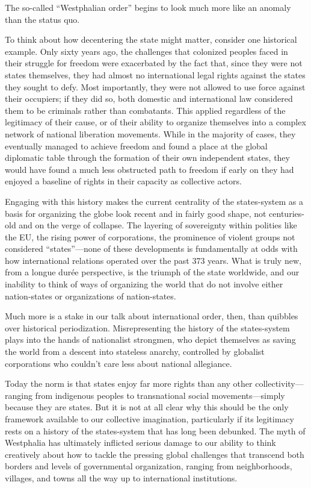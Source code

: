 \documentclass[
]{book}
\begin{document}
The so-called ``Westphalian order'' begins to look much more like an anomaly than the status quo.

To think about how decentering the state might matter, consider one historical example. Only sixty years ago, the challenges that colonized peoples faced in their struggle for freedom were exacerbated by the fact that, since they were not states themselves, they had almost no international legal rights against the states they sought to defy. Most importantly, they were not allowed to use force against their occupiers; if they did so, both domestic and international law considered them to be criminals rather than combatants. This applied regardless of the legitimacy of their cause, or of their ability to organize themselves into a complex network of national liberation movements. While in the majority of cases, they eventually managed to achieve freedom and found a place at the global diplomatic table through the formation of their own independent states, they would have found a much less obstructed path to freedom if early on they had enjoyed a baseline of rights in their capacity as collective actors.

Engaging with this history makes the current centrality of the states-system as a basis for organizing the globe look recent and in fairly good shape, not centuries-old and on the verge of collapse. The layering of sovereignty within polities like the EU, the rising power of corporations, the prominence of violent groups not considered ``states''---none of these developments is fundamentally at odds with how international relations operated over the past 373 years. What is truly new, from a longue durée perspective, is the triumph of the state worldwide, and our inability to think of ways of organizing the world that do not involve either nation-states or organizations of nation-states.

Much more is a stake in our talk about international order, then, than quibbles over historical periodization. Misrepresenting the history of the states-system plays into the hands of nationalist strongmen, who depict themselves as saving the world from a descent into stateless anarchy, controlled by globalist corporations who couldn't care less about national allegiance.

Today the norm is that states enjoy far more rights than any other collectivity---ranging from indigenous peoples to transnational social movements---simply because they are states. But it is not at all clear why this should be the only framework available to our collective imagination, particularly if its legitimacy rests on a history of the states-system that has long been debunked. The myth of Westphalia has ultimately inflicted serious damage to our ability to think creatively about how to tackle the pressing global challenges that transcend both borders and levels of governmental organization, ranging from neighborhoods, villages, and towns all the way up to international institutions.
\end{document}
